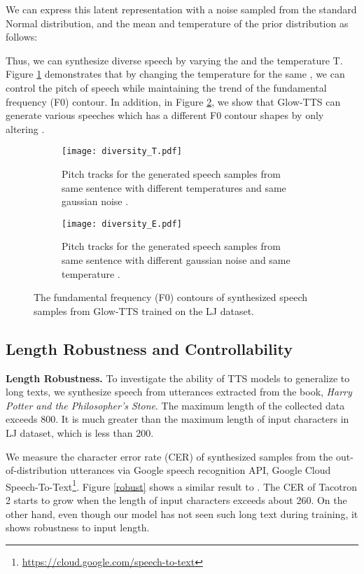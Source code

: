 \documentclass{article}
\begin{document}
We can express this latent representation  with a noise  sampled from the standard Normal distribution, and the mean  and temperature  of the prior distribution as follows:



Thus, we can synthesize diverse speech by varying the  and the temperature T. Figure \ref{fig4:a} demonstrates that by changing the temperature for the same , we can control the pitch of speech while maintaining the trend of the fundamental frequency (F0) contour. In addition, in Figure \ref{fig4:b}, we show that Glow-TTS can generate various speeches which has a different F0 contour shapes by only altering .

\begin{figure}
\begin{subfigure}{\linewidth}
\texttt{[image: diversity\_T.pdf]}
\caption{Pitch tracks for the generated speech samples from same sentence with different temperatures  and same gaussian noise .} \label{fig4:a}
\end{subfigure}
\hspace*{\fill} 
\begin{subfigure}{\linewidth}
\texttt{[image: diversity\_E.pdf]}
\caption{Pitch tracks for the generated speech samples from same sentence with different gaussian noise  and same temperature .} \label{fig4:b}
\end{subfigure}
\caption{The fundamental frequency (F0) contours of synthesized speech samples from Glow-TTS trained on the LJ dataset.} \label{fig:diversity}
\end{figure}

\subsection{Length Robustness and Controllability}
\label{robust_and_control}
\textbf{Length Robustness.}
To investigate the ability of TTS models to generalize to long texts, we synthesize speech from utterances extracted from the book, \textit{Harry Potter and the Philosopher's Stone}. The maximum length of the collected data exceeds 800. It is much greater than the maximum length of input characters in LJ dataset, which is less than 200.

We measure the character error rate (CER) of synthesized samples from the out-of-distribution utterances via Google speech recognition API, Google Cloud Speech-To-Text\footnote{\href{https://cloud.google.com/speech-to-text}{https://cloud.google.com/speech-to-text}}. Figure \ref{robust} shows a similar result to \cite{battenberg2019location}. The CER of Tacotron 2 starts to grow when the length of input characters exceeds about 260. On the other hand, even though our model has not seen such long text during training, it shows robustness to input length.
\end{document}
